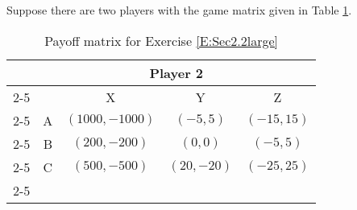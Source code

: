 \begin{xca}\label{E:Sec2.2large}  Suppose there are two players with the game matrix given in Table \ref{T:matrixEx2Sec2.2}.




\begin{table}[h]
\centering

\begin{tabular}{ccccc}
                      & \multicolumn{4}{c}{Player 2}                                                  \\ \cline{2-5} 
\multicolumn{1}{l|}{} & \multicolumn{1}{l|}{} & \multicolumn{1}{c|}{X} & \multicolumn{1}{c|}{Y} & \multicolumn{1}{c|}{Z}\\ \cline{2-5} 
\multicolumn{1}{l|}{Player 1} & \multicolumn{1}{c|}{A} & \multicolumn{1}{c|}{$(1000, -1000)$} & \multicolumn{1}{c|}{$(-5, 5)$} & \multicolumn{1}{c|}{$(-15,15)$}\\ \cline{2-5} 
\multicolumn{1}{l|}{} & \multicolumn{1}{c|}{B} & \multicolumn{1}{c|}{$(200, -200)$} & \multicolumn{1}{c|}{$(0, 0)$} & \multicolumn{1}{c|}{$(-5,5)$}\\ \cline{2-5} 
\multicolumn{1}{l|}{} & \multicolumn{1}{c|}{C} & \multicolumn{1}{c|}{$(500, -500)$} & \multicolumn{1}{c|}{$(20, -20)$} & \multicolumn{1}{c|}{$(-25,25)$} \\ \cline{2-5} 
\end{tabular}
\caption{Payoff matrix for Exercise \ref{E:Sec2.2large}}
\label{T:matrixEx2Sec2.2}
\end{table}




\end{xca}

